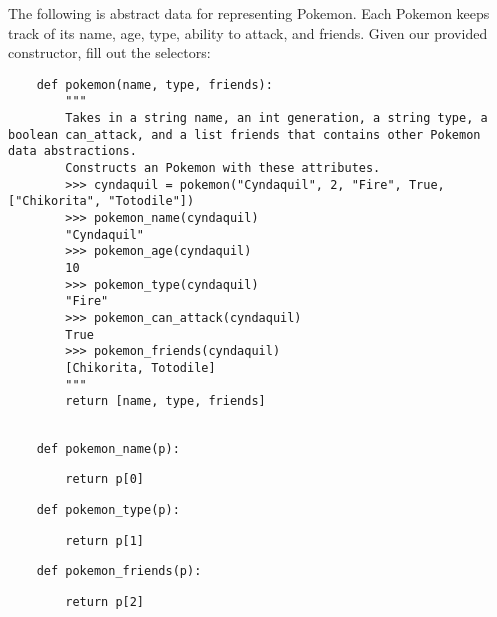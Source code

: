 \begin{blocksection}
    \question The following is abstract data for representing Pokemon.
    Each Pokemon keeps track of its name, age, type, ability to attack, and friends. Given
    our provided constructor, fill out the selectors:
    
    \begin{lstlisting}
    def pokemon(name, type, friends):
        """
        Takes in a string name, an int generation, a string type, a boolean can_attack, and a list friends that contains other Pokemon data abstractions.
        Constructs an Pokemon with these attributes.
        >>> cyndaquil = pokemon("Cyndaquil", 2, "Fire", True, ["Chikorita", "Totodile"])
        >>> pokemon_name(cyndaquil)
        "Cyndaquil"
        >>> pokemon_age(cyndaquil)
        10
        >>> pokemon_type(cyndaquil)
        "Fire"
        >>> pokemon_can_attack(cyndaquil)
        True
        >>> pokemon_friends(cyndaquil)
        [Chikorita, Totodile]
        """
        return [name, type, friends]
    
    \end{lstlisting}
    
    \end{blocksection}
    \begin{blocksection}
    
    \begin{lstlisting}
    def pokemon_name(p):
    \end{lstlisting}
    \begin{solution}[1in]
    \begin{lstlisting}
        return p[0]
    \end{lstlisting}
    \end{solution}
    \end{blocksection}
    \begin{blocksection}
    
    \begin{lstlisting}
    def pokemon_type(p):
    \end{lstlisting}
    \begin{solution}[1in]
    \begin{lstlisting}
        return p[1]
    \end{lstlisting}
    \end{solution}
    \end{blocksection}
    \begin{blocksection}
    
    \begin{lstlisting}
    def pokemon_friends(p):
    \end{lstlisting}
    \begin{solution}[1in]
    \begin{lstlisting}
        return p[2]
    \end{lstlisting}
    \end{solution}
    \end{blocksection}
    

